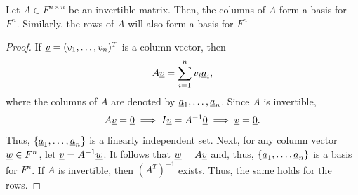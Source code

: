 \begin{lemma}
Let $A\in F^{n \times n}$ be an invertible matrix.
Then, the columns of $A$ form a basis for $F^n$.
Similarly, the rows of $A$ will also form a basis for $F^n$
\end{lemma}
\begin{proof}
If $\underline{v} = (v_1, \ldots, v_n)^T$ is a column vector, then
\begin{equation*}
A \underline{v} = \sum_{i=1}^n v_i \underline{a}_i,
\end{equation*}
where the columns of $A$ are denoted by $\underline{a}_1, \ldots, \underline{a}_n$.
Since $A$ is invertible,
\begin{equation*}
A \underline{v} = \underline{0} \implies I \underline{v} = A^{-1} \underline{0} \implies \underline{v} = \underline{0}.
\end{equation*}
Thus, $\{ \underline{a}_1, \ldots, \underline{a}_n \}$ is a linearly independent set.
Next, for any column vector $\underline{w} \in F^n$, let $\underline{v} = A^{-1} \underline{w}$.
It follows that $\underline{w} = A \underline{v}$ and, thus, $\{ \underline{a}_1, \ldots, \underline{a}_n \}$ is a basis for $F^n$.
If $A$ is invertible, then $(A^T)^{-1}$ exists.
Thus, the same holds for the rows.
\end{proof}

